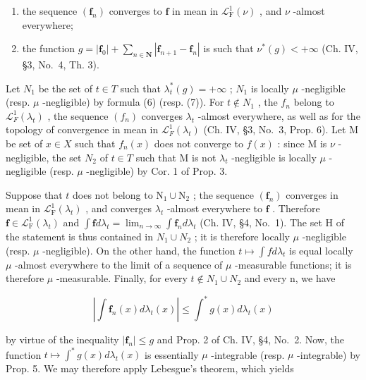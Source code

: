 \begin{enumerate}
\def\labelenumi{\arabic{enumi})}
\item
  the sequence \((\mathbf{f}_n)\) converges to \(\mathbf{f}\) in mean in \(\mathcal{L}_{\mathrm{F}}^{1}(\nu)\) , and \(\nu\) -almost everywhere;
\item
  the function \(g = |\mathbf{f}_0| + \sum_{n\in \mathbf{N}}|\mathbf{f}_{n + 1} - \mathbf{f}_n|\) is such that \(\nu^{*}(g) < +\infty\) (Ch. IV, §3, No.~4, Th. 3).
\end{enumerate}

Let \(N_{1}\) be the set of \(t \in T\) such that \(\lambda_{t}^{*}(g) = +\infty\) ; \(N_{1}\) is locally \(\mu\) -negligible (resp. \(\mu\) -negligible) by formula (6) (resp. (7)). For \(t \notin N_{1}\) , the \(f_{n}\) belong to \(\mathcal{L}_{F}^{1}(\lambda_{t})\) , the sequence \((f_{n})\) converges \(\lambda_{t}\) -almost everywhere, as well as for the topology of convergence in mean in \(\mathcal{L}_{F}^{1}(\lambda_{t})\) (Ch. IV, §3, No.~3, Prop. 6). Let M be set of \(x \in X\) such that \(f_{n}(x)\) does not converge to \(f(x)\) : since M is \(\nu\) -negligible, the set \(N_{2}\) of \(t \in T\) such that M is not \(\lambda_{t}\) -negligible is locally \(\mu\) -negligible (resp. \(\mu\) -negligible) by Cor. 1 of Prop. 3.

Suppose that \(t\) does not belong to \(\mathrm{N}_1 \cup \mathrm{N}_2\) ; the sequence \((\mathbf{f}_n)\) converges in mean in \(\mathcal{L}_{\mathrm{F}}^{1}(\lambda_t)\) , and converges \(\lambda_t\) -almost everywhere to \(\mathbf{f}\) . Therefore \(\mathbf{f} \in \mathcal{L}_{\mathrm{F}}^{1}(\lambda_t)\) and \(\int \mathbf{f} d\lambda_t = \lim_{n \to \infty} \int \mathbf{f}_n d\lambda_t\) (Ch. IV, §4, No.~1). The set H of the statement is thus contained in \(N_{1} \cup N_{2}\) ; it is therefore locally \(\mu\) -negligible (resp. \(\mu\) -negligible). On the other hand, the function \(t \mapsto \int f d\lambda_{t}\) is equal locally \(\mu\) -almost everywhere to the limit of a sequence of \(\mu\) -measurable functions; it is therefore \(\mu\) -measurable. Finally, for every \(t \notin N_{1} \cup N_{2}\) and every n, we have

\[
\left| \int \mathbf {f} _ {n} (x) d \lambda_ {t} (x) \right| \leqslant \int^ {*} g (x) d \lambda_ {t} (x)
\]

by virtue of the inequality \(|\mathbf{f}_n| \leqslant g\) and Prop. 2 of Ch. IV, §4, No.~2. Now, the function \(t \mapsto \int^{*} g(x) d\lambda_t(x)\) is essentially \(\mu\) -integrable (resp. \(\mu\) -integrable) by Prop. 5. We may therefore apply Lebesgue's theorem, which yields

